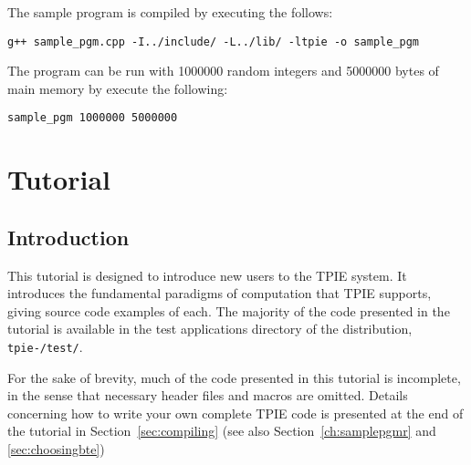 

The sample program is compiled by executing the follows:

\begin{verbatim}
g++ sample_pgm.cpp -I../include/ -L../lib/ -ltpie -o sample_pgm
\end{verbatim}

The program can be run with 1000000 random integers and 5000000 bytes of main
memory by execute the following:
\begin{verbatim}
sample_pgm 1000000 5000000
\end{verbatim}


\chapter{Tutorial}
\label{ch:tutorial}

\section{Introduction}

This tutorial is designed to introduce new users to the TPIE system.
It introduces the fundamental paradigms of computation that TPIE
supports, giving source code examples of each.  The majority of the
code presented in the tutorial is available in the test
applications directory of the distribution, 
{\tt tpie-\version/test/}.

For the sake of brevity, much of the code presented in this tutorial is
incomplete, in the sense that necessary header files 
and macros are omitted. Details concerning how to write your
own complete TPIE code is presented at the end of the tutorial in
Section~\ref{sec:compiling} (see also Section~\ref{ch:samplepgmr} and
\ref{sec:choosingbte})



